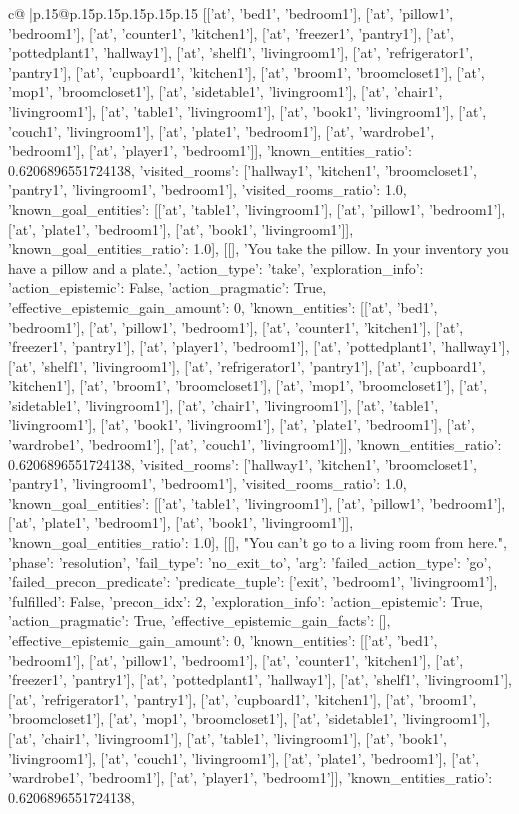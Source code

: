 \documentclass{article}
\begin{document}
{\begin{supertabular}{c@{$\;$}|p{.15\linewidth}@{}p{.15\linewidth}p{.15\linewidth}p{.15\linewidth}p{.15\linewidth}p{.15\linewidth}}
{{{[['at', 'bed1', 'bedroom1'], ['at', 'pillow1', 'bedroom1'], ['at', 'counter1', 'kitchen1'], ['at', 'freezer1', 'pantry1'], ['at', 'pottedplant1', 'hallway1'], ['at', 'shelf1', 'livingroom1'], ['at', 'refrigerator1', 'pantry1'], ['at', 'cupboard1', 'kitchen1'], ['at', 'broom1', 'broomcloset1'], ['at', 'mop1', 'broomcloset1'], ['at', 'sidetable1', 'livingroom1'], ['at', 'chair1', 'livingroom1'], ['at', 'table1', 'livingroom1'], ['at', 'book1', 'livingroom1'], ['at', 'couch1', 'livingroom1'], ['at', 'plate1', 'bedroom1'], ['at', 'wardrobe1', 'bedroom1'], ['at', 'player1', 'bedroom1']], 'known_entities_ratio': 0.6206896551724138, 'visited_rooms': ['hallway1', 'kitchen1', 'broomcloset1', 'pantry1', 'livingroom1', 'bedroom1'], 'visited_rooms_ratio': 1.0, 'known_goal_entities': [['at', 'table1', 'livingroom1'], ['at', 'pillow1', 'bedroom1'], ['at', 'plate1', 'bedroom1'], ['at', 'book1', 'livingroom1']], 'known_goal_entities_ratio': 1.0}}], [[], 'You take the pillow. In your inventory you have a pillow and a plate.', {'action_type': 'take', 'exploration_info': {'action_epistemic': False, 'action_pragmatic': True, 'effective_epistemic_gain_amount': 0, 'known_entities': [['at', 'bed1', 'bedroom1'], ['at', 'pillow1', 'bedroom1'], ['at', 'counter1', 'kitchen1'], ['at', 'freezer1', 'pantry1'], ['at', 'player1', 'bedroom1'], ['at', 'pottedplant1', 'hallway1'], ['at', 'shelf1', 'livingroom1'], ['at', 'refrigerator1', 'pantry1'], ['at', 'cupboard1', 'kitchen1'], ['at', 'broom1', 'broomcloset1'], ['at', 'mop1', 'broomcloset1'], ['at', 'sidetable1', 'livingroom1'], ['at', 'chair1', 'livingroom1'], ['at', 'table1', 'livingroom1'], ['at', 'book1', 'livingroom1'], ['at', 'plate1', 'bedroom1'], ['at', 'wardrobe1', 'bedroom1'], ['at', 'couch1', 'livingroom1']], 'known_entities_ratio': 0.6206896551724138, 'visited_rooms': ['hallway1', 'kitchen1', 'broomcloset1', 'pantry1', 'livingroom1', 'bedroom1'], 'visited_rooms_ratio': 1.0, 'known_goal_entities': [['at', 'table1', 'livingroom1'], ['at', 'pillow1', 'bedroom1'], ['at', 'plate1', 'bedroom1'], ['at', 'book1', 'livingroom1']], 'known_goal_entities_ratio': 1.0}}], [[], "You can't go to a living room from here.", {'phase': 'resolution', 'fail_type': 'no_exit_to', 'arg': {'failed_action_type': 'go', 'failed_precon_predicate': {'predicate_tuple': ['exit', 'bedroom1', 'livingroom1'], 'fulfilled': False, 'precon_idx': 2}}, 'exploration_info': {'action_epistemic': True, 'action_pragmatic': True, 'effective_epistemic_gain_facts': [], 'effective_epistemic_gain_amount': 0, 'known_entities': [['at', 'bed1', 'bedroom1'], ['at', 'pillow1', 'bedroom1'], ['at', 'counter1', 'kitchen1'], ['at', 'freezer1', 'pantry1'], ['at', 'pottedplant1', 'hallway1'], ['at', 'shelf1', 'livingroom1'], ['at', 'refrigerator1', 'pantry1'], ['at', 'cupboard1', 'kitchen1'], ['at', 'broom1', 'broomcloset1'], ['at', 'mop1', 'broomcloset1'], ['at', 'sidetable1', 'livingroom1'], ['at', 'chair1', 'livingroom1'], ['at', 'table1', 'livingroom1'], ['at', 'book1', 'livingroom1'], ['at', 'couch1', 'livingroom1'], ['at', 'plate1', 'bedroom1'], ['at', 'wardrobe1', 'bedroom1'], ['at', 'player1', 'bedroom1']], 'known_entities_ratio': 0.6206896551724138, }}}
\end{supertabular}}
\end{document}
